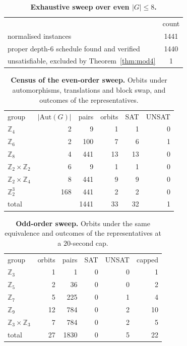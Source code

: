 \documentclass[reprint,twocolumn,superscriptaddress,nofootinbib]{revtex4-2}
\theoremstyle{plain}
\begin{document}
\begin{table}[!htbp]
\caption{\textbf{Exhaustive sweep over even $|G|\le8$.}}
\label{tab:sweep}
\begin{ruledtabular}
\begin{tabular}{lc}
 & count \\
\colrule
normalised instances & 1441 \\
proper depth-$6$ schedule found and verified & 1440 \\
unsatisfiable, excluded by Theorem~\ref{thm:mod4} & 1 \\
\end{tabular}
\end{ruledtabular}
\end{table}

\begin{table}[!htbp]
\caption{\textbf{Census of the even-order sweep.} Orbits under
automorphisms, translations and block swap, and outcomes of the
representatives.}
\label{tab:sweep-census}
\begin{ruledtabular}
\begin{tabular}{lrrrrr}
group & $|\mathrm{Aut}(G)|$ & pairs & orbits & SAT & UNSAT \\
\colrule
$\mathbb{Z}_4$            & 2   & 9    & 1  & 1  & 0 \\
$\mathbb{Z}_6$            & 2   & 100  & 7  & 6  & 1 \\
$\mathbb{Z}_8$            & 4   & 441  & 13 & 13 & 0 \\
$\mathbb{Z}_2\times\mathbb{Z}_2$ & 6 & 9  & 1  & 1  & 0 \\
$\mathbb{Z}_2\times\mathbb{Z}_4$ & 8 & 441 & 9 & 9  & 0 \\
$\mathbb{Z}_2^3$          & 168 & 441  & 2  & 2  & 0 \\
\colrule
total                     &     & 1441 & 33 & 32 & 1 \\
\end{tabular}
\end{ruledtabular}
\end{table}

\begin{table}[!htbp]
\caption{\textbf{Odd-order sweep.} Orbits under the same equivalence and
outcomes of the representatives at a $20$-second cap.}
\label{tab:sweep-odd}
\begin{ruledtabular}
\begin{tabular}{lrrrrr}
group & orbits & pairs & SAT & UNSAT & capped \\
\colrule
$\mathbb{Z}_3$ & 1  & 1   & 0 & 0 & 1  \\
$\mathbb{Z}_5$ & 2  & 36  & 0 & 0 & 2  \\
$\mathbb{Z}_7$ & 5  & 225 & 0 & 1 & 4  \\
$\mathbb{Z}_9$ & 12 & 784 & 0 & 2 & 10 \\
$\mathbb{Z}_3\times\mathbb{Z}_3$ & 7 & 784 & 0 & 2 & 5 \\
\colrule
total & 27 & 1830 & 0 & 5 & 22 \\
\end{tabular}
\end{ruledtabular}
\end{table}
\end{document}
